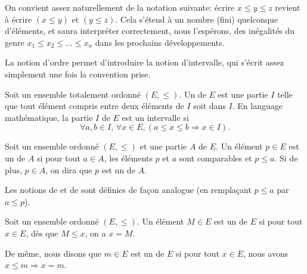 \begin{normaltext}\label{NORMooIntroIntervalleOrdonne}
	On convient assez naturellement de la notation suivante: écrire \( x \leq y \leq z \) revient à écrire \( (x \leq y)\text{ et } (y \leq z) \). Cela s'étend à un nombre (fini) quelconque d'éléments, et  saura interpréter correctement, nous l'espérons, des inégalités du genre \( x_1 \leq x_2 \leq \dots \leq x_n \) dans les prochains développements.

	La notion d'ordre permet d'introduire la notion d'intervalle, qui s'écrit assez simplement une fois la convention prise.
\end{normaltext}

\begin{definition}  \label{DefEYAooMYYTz}
	Soit un ensemble totalement ordonné \( (E,\leq)\). Un  de \( E\) est une partie \( I\) telle que tout élément compris entre deux éléments de \( I \) soit dans \( I \). En language mathématique, la partie \( I \) de \( E\) est un intervalle si
	\[
		\forall a,b\in I,\, \forall x \in E, (a\leq x\leq b \Rightarrow x\in I).
	\]
\end{definition}

\begin{definition}      \label{DEFooDNWRooTiMAzK}
	Soit un ensemble ordonné \( (E,\leq)\) et une partie \( A\) de \( E\). Un élément \( p\in E\) est un  de \( A\) si pour tout \( a\in A\), les éléments \( p\) et \( a\) sont comparables et \( p\leq a\). Si de plus, \( p \in A \), on dira que \( p \) est un  de \( A\).

	Les notions de  et de  sont définies de façon analogue (en remplaçant \( p\leq a\) par \( a\leq p\)).
\end{definition}


\begin{definition}        \label{DEFooBZNRooYRPGme}
	Soit un ensemble ordonné \( (E,\leq)\). Un élément \(M\in E\) est un  de \( E\) si pour tout \( x\in E\), dès que \( M\leq x\), on a \(x=M\).

	De même, nous disons que \( m\in E\) est un  de \( E\) si pour tout \( x\in E\), nous avons \( x\leq m\Rightarrow x=m\).
\end{definition}


